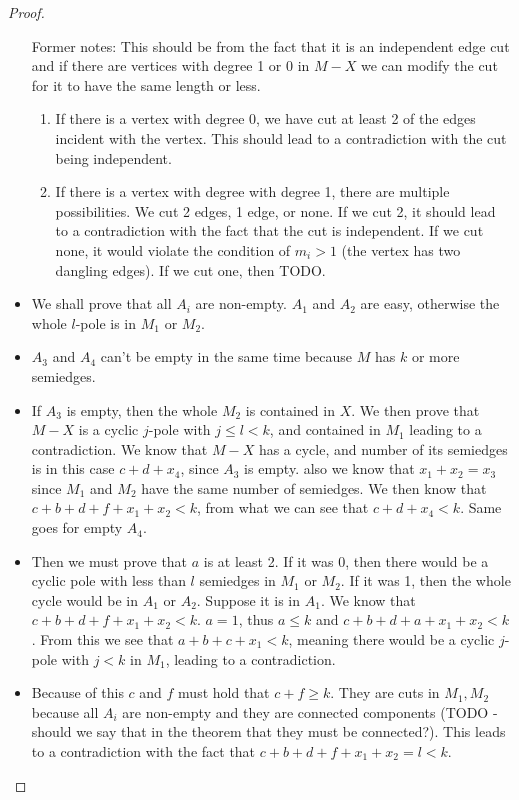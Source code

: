 \documentclass[12pt, twoside]{book}
\begin{document}
\begin{proof}
\begin{itemize}
		Former notes: This should be from the fact that it is an independent edge cut and if there are vertices with degree 1 or 0 in $M-X$ we can modify the cut for it to have the same length or less.
		\begin{enumerate}
			\item If there is a vertex with degree 0, we have cut at least 2 of the edges incident with the vertex. This should lead to a contradiction with the cut being independent.
			\item If there is a vertex with degree with degree 1, there are multiple possibilities. We cut 2 edges, 1 edge, or none. If we cut 2, it should lead to a contradiction with the fact that the cut is independent. If we cut none, it would violate the condition of $m_i>1$ (the vertex has two dangling edges). If we cut one, then TODO.
		\end{enumerate}
		\item We shall prove that all $A_i$ are non-empty. $A_1$ and $A_2$ are easy, otherwise the whole $l$-pole is in $M_1$ or $M_2$.
		\item $A_3$ and $A_4$ can't be empty in the same time because $M$ has $k$ or more semiedges.
		\item If $A_3$ is empty, then the whole $M_2$ is contained in $X$. We then prove that $M-X$ is a cyclic $j$-pole with $j\leq l < k$, and contained in $M_1$ leading to a contradiction. We know that $M-X$ has a cycle, and number of its semiedges is in this case $c+d+x_4$, since $A_3$ is empty. also we know that $x_1+x_2=x_3$ since $M_1$ and $M_2$ have the same number of semiedges. We then know that $c+b+d+f+x_1+x_2<k$, from what we can see that $c+d+x_4<k$. Same goes for empty $A_4$.
		\item Then we must prove that $a$ is at least 2. If it was 0, then there would be a cyclic pole with less than $l$ semiedges in $M_1$ or $M_2$. If it was 1, then the whole cycle would be in $A_1$ or $A_2$. Suppose it is in $A_1$. We know that $c+b+d+f+x_1+x_2<k$. $a=1$, thus $a\leq k$ and $c+b+d+a+x_1+x_2<k$. From this we see that $a+b+c+x_1<k$, meaning there would be a cyclic $j$-pole with $j<k$ in $M_1$, leading to a contradiction.
		\item Because of this $c$ and $f$ must hold that $c+f\geq k$. They are cuts in $M_1, M_2$ because all $A_i$ are non-empty and they are connected components (TODO - should we say that in the theorem that they must be connected?). This leads to a contradiction with the fact that $c+b+d+f+x_1+x_2=l<k$.
	\end{itemize}
\end{proof}
\end{document}
